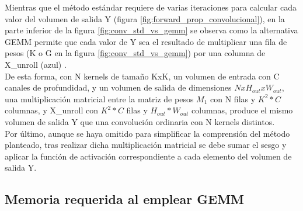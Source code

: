 Mientras que el método estándar requiere de varias iteraciones para calcular cada valor del volumen de salida Y (figura \ref{fig:forward_prop_convolucional}), en la parte inferior de la figura \ref{fig:conv_std_vs_gemm} se observa como la alternativa GEMM permite que cada valor de Y sea el resultado de multiplicar una fila de pesos (K o G en la figura \ref{fig:conv_std_vs_gemm}) por una columna de X\_unroll (azul) \cite{Programming_Massively}. \\
De esta forma, con N kernels de tamaño KxK, un volumen de entrada con C canales de profundidad, y un volumen de salida de dimensiones $NxH_{out}xW_{out}$, una multiplicación matricial entre la matriz de pesos $M_1$ con N filas y $K^2*C$ columnas, y X\_unroll con $K^2*C$ filas y $H_{out}*W_{out}$ columnas, produce el mismo volumen de salida Y que una convolución ordinaria con N kernels distintos. \\
Por último, aunque se haya omitido para simplificar la comprensión del método planteado, tras realizar dicha multiplicación matricial se debe sumar el sesgo y aplicar la función de activación correspondiente a cada elemento del volumen de salida Y.

\subsection{Memoria requerida al emplear GEMM}

